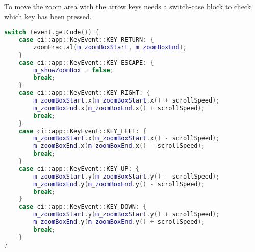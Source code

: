 To move the zoom area with the arrow keys needs a switch-case block to check which key has been pressed.

\begin{lstlisting}[language=c++]
switch (event.getCode()) {
	case ci::app::KeyEvent::KEY_RETURN: {
		zoomFractal(m_zoomBoxStart, m_zoomBoxEnd);
	}
	case ci::app::KeyEvent::KEY_ESCAPE: {
		m_showZoomBox = false;
		break;
	}
	case ci::app::KeyEvent::KEY_RIGHT: {
		m_zoomBoxStart.x(m_zoomBoxStart.x() + scrollSpeed);
		m_zoomBoxEnd.x(m_zoomBoxEnd.x() + scrollSpeed);
		break;
	}
	case ci::app::KeyEvent::KEY_LEFT: {
		m_zoomBoxStart.x(m_zoomBoxStart.x() - scrollSpeed);
		m_zoomBoxEnd.x(m_zoomBoxEnd.x() - scrollSpeed);
		break;
	}
	case ci::app::KeyEvent::KEY_UP: {
		m_zoomBoxStart.y(m_zoomBoxStart.y() - scrollSpeed);
		m_zoomBoxEnd.y(m_zoomBoxEnd.y() - scrollSpeed);
		break;
	}
	case ci::app::KeyEvent::KEY_DOWN: {
		m_zoomBoxStart.y(m_zoomBoxStart.y() + scrollSpeed);
		m_zoomBoxEnd.y(m_zoomBoxEnd.y() + scrollSpeed);
		break;
	}
}
\end{lstlisting}


